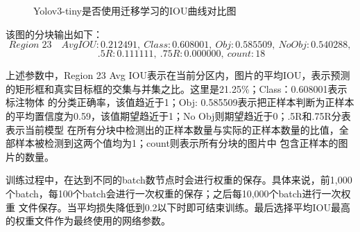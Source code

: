 \begin{figure}[h]
    \centering
    \caption{Yolov3-tiny是否使用迁移学习的IOU曲线对比图}
    \label{fig:IOU_TL}
\end{figure}

该图的分块输出如下：
$$Region\;23 \quad Avg IOU: 0.212491, \  Class: 0.608001, \  Obj: 0.585509, \  No Obj: 0.540288, $$
$$\ .5R: 0.111111, \ .75R: 0.000000, \  count: 18$$

上述参数中，Region 23 Avg IOU表示在当前分区内，图片的平均IOU，表示预测的矩形框和真实目标框的交集与并集之比。这里是21.25\%；Class：0.608001表示标注物体
的分类正确率，该值趋近于1；Obj: 0.585509表示把正样本判断为正样本的平均置信度为0.59，该值期望趋近于1；No Obj则期望趋近于0；.5R和.75R分表表示当前模型
在所有分块中检测出的正样本数量与实际的正样本数量的比值，全部样本被检测到这两个值均为1；count则表示所有分块的图片中
包含正样本的图片的数量。

训练过程中，在达到不同的batch数节点时会进行权重的保存。具体来说，前1,000个batch，每100个batch会进行一次权重的保存；之后每10,000个batch进行一次权重
文件保存。当平均损失降低到0.2以下时即可结束训练。最后选择平均IOU最高的权重文件作为最终使用的网络参数。


